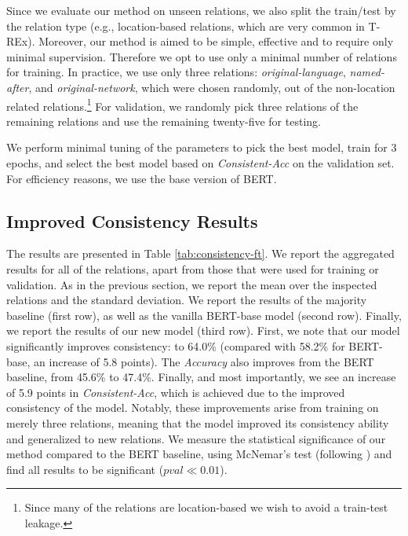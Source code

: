 Since we evaluate our method on unseen relations, we also split the train/test by the relation type (e.g., location-based relations, which are very common
in T-REx).  Moreover, our method is aimed to be simple,
effective and to require only minimal supervision. Therefore
we opt to use only a minimal number of relations for
training.  In practice, we use only three relations:
\textit{original-language}, \textit{named-after}, and
\textit{original-network}, which were chosen randomly, out of
the non-location related relations.\footnote{Since many of
  the relations are location-based we wish to avoid
  a train-test leakage.} 
For validation, we randomly pick three
relations of the remaining relations and use the remaining
twenty-five for testing.

We perform minimal tuning of the parameters to pick the best model, train for 3 epochs, and select the best model based on  \textit{Consistent-Acc} on the validation set.
For efficiency reasons, we use the base version of BERT.



\subsection{Improved Consistency Results}



The results are presented in Table
\ref{tab:consistency-ft}. We report the aggregated results
for all of the relations, apart from those that were used
for training or validation. As in the previous section, we
report the mean over the inspected relations and the
standard deviation.  We report the results of the majority
baseline (first row), as well as the vanilla BERT-base model (second row). Finally, we report
the results of our new model (third row).  First, we note
that our model significantly improves consistency:
to 64.0\%
(compared with 58.2\% for BERT-base,
an increase
of 5.8 points).  The \textit{Accuracy} also improves from the BERT
baseline, from 45.6\% to 47.4\%. Finally, and most
importantly, we see an increase of 5.9 points in
\textit{Consistent-Acc}, which is achieved due to the improved
consistency of the model.  Notably, these improvements
arise from training on merely three relations, meaning that
the model improved its consistency ability and generalized
to new relations.  We measure the statistical
significance of our method compared to the BERT baseline,
using McNemar's test (following
\citet{dror2018hitchhiker,dror2020statistical}) and find all
results to be significant ($pval \ll 0.01$).

